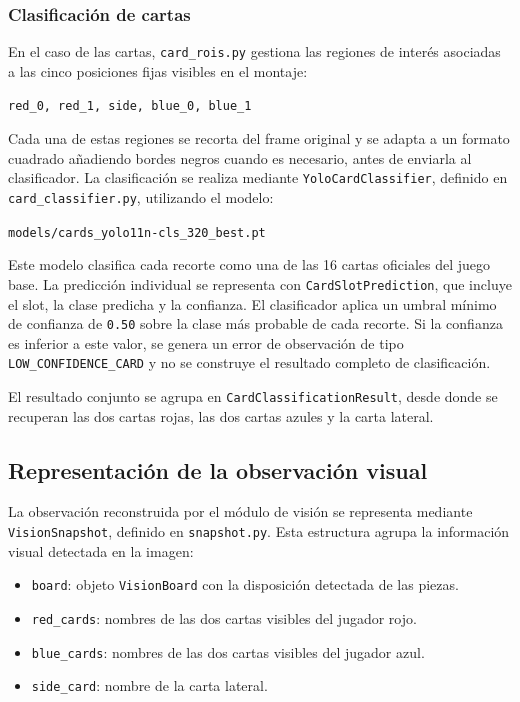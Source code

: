 \subsubsection{Clasificación de cartas}

En el caso de las cartas, \texttt{card\_rois.py} gestiona las regiones de interés asociadas a las cinco posiciones fijas visibles en el montaje:

\begin{center}
\texttt{red\_0, red\_1, side, blue\_0, blue\_1}
\end{center}

Cada una de estas regiones se recorta del frame original y se adapta a un formato cuadrado añadiendo bordes negros cuando es necesario, antes de enviarla al clasificador. La clasificación se realiza mediante \texttt{YoloCardClassifier}, definido en \texttt{card\_classifier.py}, utilizando el modelo:

\begin{center}
\texttt{models/cards\_yolo11n-cls\_320\_best.pt}
\end{center}

Este modelo clasifica cada recorte como una de las 16 cartas oficiales del juego base. La predicción individual se representa con \texttt{CardSlotPrediction}, que incluye el slot, la clase predicha y la confianza. El clasificador aplica un umbral mínimo de confianza de \texttt{0.50} sobre la clase más probable de cada recorte. Si la confianza es inferior a este valor, se genera un error de observación de tipo \texttt{LOW\_CONFIDENCE\_CARD} y no se construye el resultado completo de clasificación.

El resultado conjunto se agrupa en \texttt{CardClassificationResult}, desde donde se recuperan las dos cartas rojas, las dos cartas azules y la carta lateral.


\subsection{Representación de la observación visual}
\label{subsec:observacion-visual}

La observación reconstruida por el módulo de visión se representa mediante \texttt{VisionSnapshot}, definido en \texttt{snapshot.py}. Esta estructura agrupa la información visual detectada en la imagen:

\begin{itemize}
    \item \texttt{board}: objeto \texttt{VisionBoard} con la disposición detectada de las piezas.
    \item \texttt{red\_cards}: nombres de las dos cartas visibles del jugador rojo.
    \item \texttt{blue\_cards}: nombres de las dos cartas visibles del jugador azul.
    \item \texttt{side\_card}: nombre de la carta lateral.
\end{itemize}

